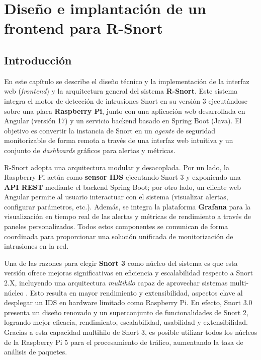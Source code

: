 \documentclass[11pt,a4paper,twoside]{report}
\begin{document}
\clearpage
\null
\thispagestyle{empty}
\newpage
\chapter{Diseño e implantación de un frontend para R-Snort}

\section{Introducción}
En este capítulo se describe el diseño técnico y la implementación de la interfaz web (\emph{frontend}) y la arquitectura general del sistema \textbf{R-Snort}. Este sistema integra el motor de detección de intrusiones Snort en su versión 3 ejecutándose sobre una placa \textbf{Raspberry Pi}, junto con una aplicación web desarrollada en Angular (versión 17) y un servicio backend basado en Spring Boot (Java). El objetivo es convertir la instancia de Snort en un \emph{agente} de seguridad monitorizable de forma remota a través de una interfaz web intuitiva y un conjunto de \emph{dashboards} gráficos para alertas y métricas.\newline

R-Snort adopta una arquitectura modular y desacoplada. Por un lado, la Raspberry Pi actúa como \textbf{sensor IDS} ejecutando Snort 3 y exponiendo una \textbf{API REST} mediante el backend Spring Boot; por otro lado, un cliente web Angular permite al usuario interactuar con el sistema (visualizar alertas, configurar parámetros, etc.). Además, se integra la plataforma \textbf{Grafana} para la visualización en tiempo real de las alertas y métricas de rendimiento a través de paneles personalizados. Todos estos componentes se comunican de forma coordinada para proporcionar una solución unificada de monitorización de intrusiones en la red.\newline

Una de las razones para elegir \textbf{Snort 3} como núcleo del sistema es que esta versión ofrece mejoras significativas en eficiencia y escalabilidad respecto a Snort 2.X, incluyendo una arquitectura \emph{multihilo} capaz de aprovechar sistemas multi-núcleo \cite{snort3differences}. Esto resulta en mayor rendimiento y extensibilidad, aspectos clave al desplegar un IDS en hardware limitado como Raspberry Pi. En efecto, Snort 3.0 presenta un diseño renovado y un superconjunto de funcionalidades de Snort 2, logrando mejor eficacia, rendimiento, escalabilidad, usabilidad y extensibilidad. Gracias a esta capacidad multihilo de Snort 3, es posible utilizar todos los núcleos de la Raspberry Pi 5 para el procesamiento de tráfico, aumentando la tasa de análisis de paquetes.\newline
\end{document}
